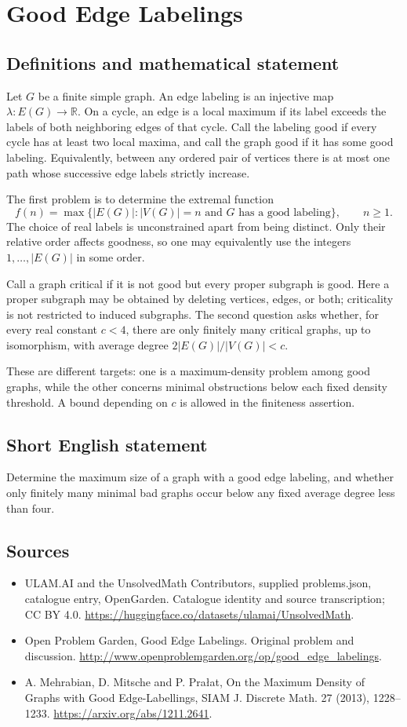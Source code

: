 \documentclass[11pt,a4paper]{article}
\begin{document}
\section*{Good Edge Labelings}\label{statement}

\subsection{Definitions and mathematical statement}
Let $G$ be a finite simple graph. An edge labeling is an injective map $\lambda:E(G)\to\mathbb R$. On a cycle, an edge is a local maximum if its label exceeds the labels of both neighboring edges of that cycle. Call the labeling good if every cycle has at least two local maxima, and call the graph good if it has some good labeling. Equivalently, between any ordered pair of vertices there is at most one path whose successive edge labels strictly increase.

The first problem is to determine the extremal function
\[
 f(n)=\max\{|E(G)|:|V(G)|=n\text{ and }G\text{ has a good labeling}\},
 \qquad n\ge1.
\]
The choice of real labels is unconstrained apart from being distinct. Only their relative order affects goodness, so one may equivalently use the integers $1,\ldots,|E(G)|$ in some order.

Call a graph critical if it is not good but every proper subgraph is good. Here a proper subgraph may be obtained by deleting vertices, edges, or both; criticality is not restricted to induced subgraphs. The second question asks whether, for every real constant $c<4$, there are only finitely many critical graphs, up to isomorphism, with average degree $2|E(G)|/|V(G)|<c$.

These are different targets: one is a maximum-density problem among good graphs, while the other concerns minimal obstructions below each fixed density threshold. A bound depending on $c$ is allowed in the finiteness assertion.
\subsection{Short English statement}
Determine the maximum size of a graph with a good edge labeling, and whether only finitely many minimal bad graphs occur below any fixed average degree less than four.
\subsection{Sources}
\begin{itemize}
\item[S1] ULAM.AI and the UnsolvedMath Contributors, supplied problems.json, catalogue entry, OpenGarden. Catalogue identity and source transcription; CC BY 4.0.
\url{https://huggingface.co/datasets/ulamai/UnsolvedMath}.
\item[S2] Open Problem Garden, Good Edge Labelings. Original problem and discussion.
\url{http://www.openproblemgarden.org/op/good_edge_labelings}.
\item[S3] A. Mehrabian, D. Mitsche and P. Prałat, On the Maximum Density of Graphs with Good Edge-Labellings, SIAM J. Discrete Math. 27 (2013), 1228--1233.
\url{https://arxiv.org/abs/1211.2641}.
\end{itemize}
\end{document}
